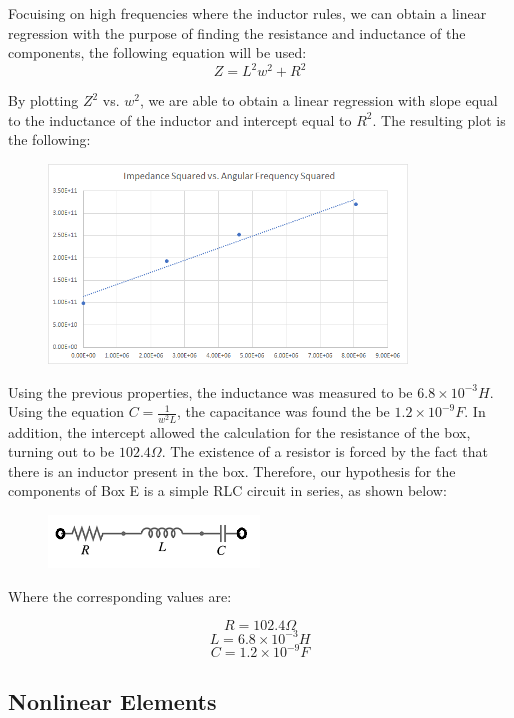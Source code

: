 \documentclass[a4paper]{article}
\begin{document}
Focuising on high frequencies where the inductor rules, we can obtain a linear regression with the purpose of finding the resistance and inductance of the components, the following equation will be used:
\begin{equation}
Z=L^2w^2+R^2
\end{equation}

By plotting $Z^2$ vs. $w^2$, we are able to obtain a linear regression with slope equal to the inductance of the inductor and intercept equal to $R^2$. The resulting plot is the following:
\begin{figure}[h]
\centering
\includegraphics[width=0.85\textwidth]{boxelinear}
\end{figure}

Using the previous properties, the inductance was measured to be $6.8\times 10^{-3}H$. Using the equation $C=\frac{1}{w^2L}$, the capacitance was found the be $1.2\times 10^{-9}F$. In addition, the intercept allowed the calculation for the resistance of the box, turning out to be $102.4\Omega$. The existence of a resistor is forced by the fact that there is an inductor present in the box. Therefore, our hypothesis for the components of Box E is a simple RLC circuit in series, as shown below:
\begin{figure}[h]
\centering
\includegraphics[width=0.5\textwidth]{boxeconfig}
\end{figure}

Where the corresponding values are:
\begin{figure}[h]
\[R=102.4\Omega\]
\[L=6.8\times 10^{-3}H\]
\[C=1.2\times 10^{-9}F\]
\end{figure}
\clearpage

\subsection{Nonlinear Elements}
\end{document}
